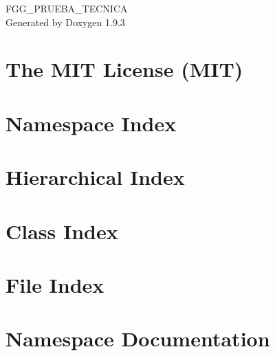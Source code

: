 \documentclass[twoside]{book}
\newcommand{\+}{\discretionary{\mbox{\scriptsize$\hookleftarrow$}}{}{}}
\newcommand{\clearemptydoublepage}{%
    \newpage{\pagestyle{empty}\cleardoublepage}%
  }
\begin{document}
  \raggedbottom
  \begin{titlepage}
  \vspace*{7cm}
  \begin{center}%
  {\Large FGG\+\_\+\+PRUEBA\+\_\+\+TECNICA}\\
  \vspace*{1cm}
  {\large Generated by Doxygen 1.9.3}\\
  \end{center}
  \end{titlepage}
  \clearemptydoublepage
  \tableofcontents
  \clearemptydoublepage
\chapter{The MIT License (MIT)}
\label{md__f_g_g__p_r_u_e_b_a__t_e_c_n_i_c_a_wwwroot_lib_jquery_validation__l_i_c_e_n_s_e}

\chapter{Namespace Index}

\chapter{Hierarchical Index}

\chapter{Class Index}

\chapter{File Index}

\chapter{Namespace Documentation}





\end{document}
